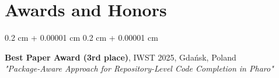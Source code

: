 \documentclass[10pt, letterpaper]{article}
\newenvironment{highlights}{
    \begin{itemize}[
        topsep=0.10 cm,
        parsep=0.10 cm,
        partopsep=0pt,
        itemsep=0pt,
        leftmargin=0.4 cm + 10pt
    ]
}{
    \end{itemize}
} %
\newenvironment{onecolentry}{
    \begin{adjustwidth}{
        0.2 cm + 0.00001 cm
    }{
        0.2 cm + 0.00001 cm
    }
}{
    \end{adjustwidth}
} %
\let\hrefWithoutArrow\href
\renewcommand{\href}[2]{\hrefWithoutArrow{#1}{\ifthenelse{\equal{#2}{}}{ }{#2 }\raisebox{.15ex}{\footnotesize \faExternalLink*}}}
\begin{document}

        
        

    \section*{Awards and Honors}
        \begin{onecolentry}
            \textbf{Best Paper Award (3rd place)}, IWST 2025, Gda\'nsk, Poland \\ \textit{"Package-Aware Approach for Repository-Level Code Completion in Pharo"}
        \end{onecolentry}
\end{document}
